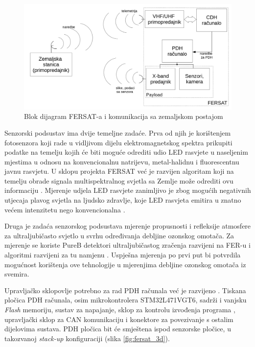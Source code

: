 \begin{figure}[htb]
    \centering
    \includegraphics[width=\textwidth]{slike/fersat_blok_dijagram.png}
    \caption{Blok dijagram FERSAT-a i komunikacija sa zemaljskom postajom \cite{diplomski_goran_petrak}}
    \label{fig:fersat_blok}
\end{figure}

Senzorski podsustav ima dvije temeljne zadaće. Prva od njih je korištenjem fotosenzora koji rade u vidljivom dijelu elektromagnetskog spektra prikupiti podatke na temelju kojih će biti moguće odrediti udio LED rasvjete u naseljenim mjestima u odnosu na konvencionalnu natrijevu, metal-halidnu i fluorescentnu javnu rasvjetu. U sklopu projekta FERSAT već je razvijen algoritam koji na temelju obrade signala multispektralnog svjetla sa Zemlje može odrediti ovu informaciju \cite{diplomski_jakov_tutavac}. Mjerenje udjela LED rasvjete zanimljivo je zbog mogućih negativnih utjecaja plavog svjetla na ljudsko zdravlje, koje LED rasvjeta emitira u znatno većem intenzitetu nego konvencionalna \cite{falchi_light_pollution}.

Druga je zadaća senzorskog podsustava mjerenje propusnosti i refleksije atmosfere za ultraljubičasto svjetlo u svrhu određivanja debljine ozonskog omotača. Za mjerenje se koriste PureB detektori ultraljubičastog zračenja razvijeni na FER-u \cite{diplomski_filip_bogdanovic} i algoritmi razvijeni za tu namjenu \cite{zavrsni_kristian_stepancic}. Uspješna mjerenja po prvi put bi potvrdila mogućnost korištenja ove tehnologije u mjerenjima debljine ozonskog omotača iz svemira.

Upravljačko sklopovlje potrebno za rad PDH računala već je razvijeno \cite{zavrsni_filip_juric}. Tiskana pločica PDH računala, osim mikrokontrolera STM32L471VGT6, sadrži i vanjsku \textit{Flash} memoriju, sustav za napajanje, sklop za kontrolu izvođenja programa , upravljački sklop za CAN komunikaciju i konektore za povezivanje s ostalim dijelovima sustava. PDH pločica bit će smještena ispod senzorske pločice, u takozvanoj \textit{stack-up} konfiguraciji (slika \ref{fig:fersat_3d}).

